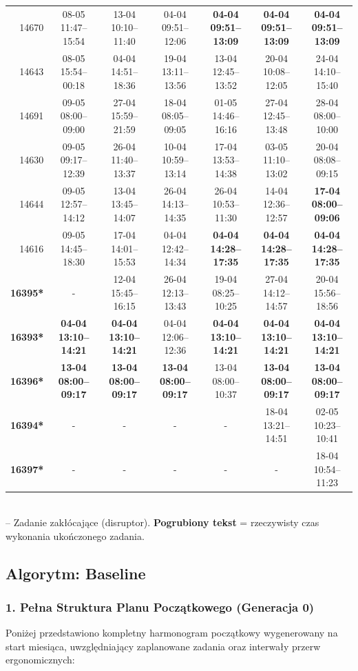 \begin{table}[htbp]
\begin{tabular}{|r|c|c|c|c|c|c|}
14670 & 08-05 11:47--15:54 & 13-04 10:10--11:40 & 04-04 09:51--12:06 & \textbf{04-04 09:51--13:09} & \textbf{04-04 09:51--13:09} & \textbf{04-04 09:51--13:09} \\ 
14643 & 08-05 15:54--00:18 & 04-04 14:51--18:36 & 19-04 13:11--13:56 & 13-04 12:45--13:52 & 20-04 10:08--12:05 & 24-04 14:10--15:40 \\ 
14691 & 09-05 08:00--09:00 & 27-04 15:59--21:59 & 18-04 08:05--09:05 & 01-05 14:46--16:16 & 27-04 12:45--13:48 & 28-04 08:00--10:00 \\ 
14630 & 09-05 09:17--12:39 & 26-04 11:40--13:37 & 10-04 10:59--13:14 & 17-04 13:53--14:38 & 03-05 11:10--13:02 & 20-04 08:08--09:15 \\ 
14644 & 09-05 12:57--14:12 & 13-04 13:45--14:07 & 26-04 14:13--14:35 & 26-04 10:53--11:30 & 14-04 12:36--12:57 & \textbf{17-04 08:00--09:06} \\ 
14616 & 09-05 14:45--18:30 & 17-04 14:01--15:53 & 04-04 12:42--14:34 & \textbf{04-04 14:28--17:35} & \textbf{04-04 14:28--17:35} & \textbf{04-04 14:28--17:35} \\ 
\hline
\textbf{16395*} & - & 12-04 15:45--16:15 & 26-04 12:13--13:43 & 19-04 08:25--10:25 & 27-04 14:12--14:57 & 20-04 15:56--18:56 \\ 
\textbf{16393*} & \textbf{04-04 13:10--14:21} & \textbf{04-04 13:10--14:21} & 04-04 12:06--12:36 & \textbf{04-04 13:10--14:21} & \textbf{04-04 13:10--14:21} & \textbf{04-04 13:10--14:21} \\ 
\textbf{16396*} & \textbf{13-04 08:00--09:17} & \textbf{13-04 08:00--09:17} & \textbf{13-04 08:00--09:17} & 13-04 08:00--10:37 & \textbf{13-04 08:00--09:17} & \textbf{13-04 08:00--09:17} \\ 
\textbf{16394*} & - & - & - & - & 18-04 13:21--14:51 & 02-05 10:23--10:41 \\ 
\textbf{16397*} & - & - & - & - & - & 18-04 10:54--11:23 \\ 
\hline
\end{tabular}
\\ {\tiny * -- Zadanie zakłócające (disruptor). \textbf{Pogrubiony tekst} = rzeczywisty czas wykonania ukończonego zadania.}
\end{table}

\vspace{0.8cm}
\subsection{Algorytm: Baseline}

\subsubsection*{1. Pełna Struktura Planu Początkowego (Generacja 0)}
Poniżej przedstawiono kompletny harmonogram początkowy wygenerowany na start miesiąca, uwzględniający zaplanowane zadania oraz interwały przerw ergonomicznych:

